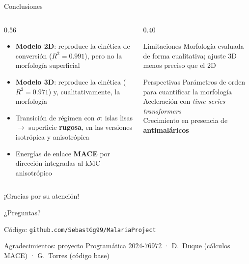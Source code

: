 \documentclass[aspectratio=169,11pt]{beamer}
\begin{document}
\begin{frame}{Conclusiones}
  \begin{columns}[T,onlytextwidth]
    \begin{column}{0.56\textwidth}
      \begin{itemize}\setlength{\itemsep}{0.7em}
        \item \textbf{Modelo 2D}: reproduce la cinética de conversión ($R^2=0.991$), pero no la morfología superficial
        \item \textbf{Modelo 3D}: reproduce la cinética ($R^2=0.971$) y, cualitativamente, la morfología
        \item Transición de régimen con $\sigma$: islas lisas $\to$ superficie \textbf{rugosa}, en las versiones isotrópica y anisotrópica
        \item Energías de enlace \textbf{MACE} por dirección integradas al kMC anisotrópico
      \end{itemize}
    \end{column}
    \begin{column}{0.40\textwidth}
      \begin{block}{Limitaciones}
        \small Morfología evaluada de forma cualitativa; ajuste 3D menos preciso que el 2D
      \end{block}
      \vspace{0.4em}
      \begin{block}{Perspectivas}
        \small
        Parámetros de orden para cuantificar la morfología\\[0.2em]
        Aceleración con \textit{time-series transformers}\\[0.2em]
        Crecimiento en presencia de \textbf{antimaláricos}
      \end{block}
    \end{column}
  \end{columns}
\end{frame}

\begin{frame}{¡Gracias por su atención!}
  \vfill
  \begin{block}{}
    \centering
    \Large ¿Preguntas?
  \end{block}
  \vfill
  \centering
  {\small Código: \texttt{github.com/SebastGg99/MalariaProject}\par}
  \vspace{0.6em}
  {\scriptsize\color{gris}Agradecimientos: proyecto Programática 2024-76972 · D.~Duque (cálculos MACE) · G.~Torres (código base)\par}
  \vfill
\end{frame}
\end{document}
